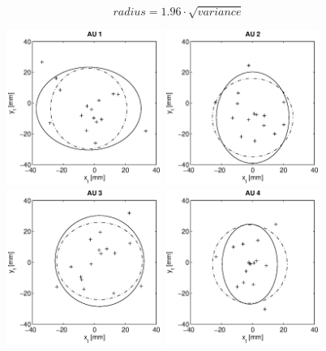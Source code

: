 \begin{equation}
\label{eq:variance_to_95pc}
radius = 1.96 \cdot \sqrt{variance}
\end{equation}

\begin{figure}[hbtp]
\centering
\includegraphics[width = 0.45\textwidth]{images/results/confidence_95_interval_AU1.eps}
\includegraphics[width = 0.45\textwidth]{images/results/confidence_95_interval_AU2.eps} \\
\includegraphics[width = 0.45\textwidth]{images/results/confidence_95_interval_AU3.eps}
\includegraphics[width = 0.45\textwidth]{images/results/confidence_95_interval_AU4.eps}

\end{figure}
